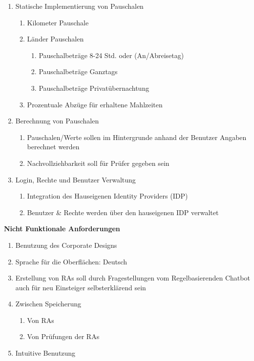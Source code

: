 \begin{enumerate}
	\item Statische Implementierung von Pauschalen
	\begin{enumerate}
		\item Kilometer Pauschale
		\item Länder Pauschalen
		\begin{enumerate}
			\item Pauschalbeträge 8-24 Std. oder (An/Abreisetag)
			\item Pauschalbeträge Ganztags
			\item Pauschalbeträge Privatübernachtung
		\end{enumerate}
		\item Prozentuale Abzüge für erhaltene Mahlzeiten
	\end{enumerate}
	\item Berechnung von Pauschalen
	\begin{enumerate}
		\item Pauschalen/Werte sollen im Hintergrunde anhand der Benutzer Angaben berechnet werden
		\item Nachvollziehbarkeit soll für Prüfer gegeben sein
	\end{enumerate}
	\item Login, Rechte und Benutzer Verwaltung
	\begin{enumerate}
		\item Integration des Hauseigenen Identity Providers (IDP)
		\item Benutzer \& Rechte werden über den hauseigenen IDP verwaltet
	\end{enumerate}
\end{enumerate}

\textbf{Nicht Funktionale Anforderungen}
\begin{enumerate}
	\item Benutzung des Corporate Designs
	\item Sprache für die Oberflächen: Deutsch
	\item Erstellung von RAs soll durch Fragestellungen vom Regelbasierenden Chatbot auch für neu Einsteiger selbsterklärend sein
	\item Zwischen Speicherung 
	\begin{enumerate}
		\item Von RAs
		\item Von Prüfungen der RAs
	\end{enumerate}
	\item Intuitive Benutzung
\end{enumerate}

